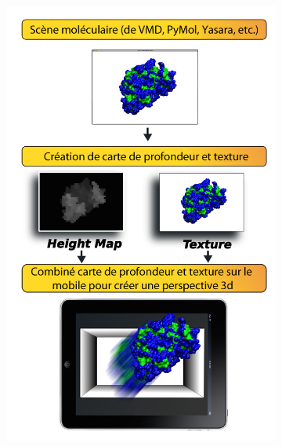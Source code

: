 \begin{figure}[h]
\begin{subfigure}{.5\textwidth}
  \centering
  {\includegraphics[width=.75\linewidth]{./figures/ch3/depthmol3d_process_edit}}
    \caption{}
  \label{Fig:depthmol3d_process}
\end{subfigure}
\begin{subfigure}{.5\textwidth}
  \centering

\end{subfigure}
\end{figure}
